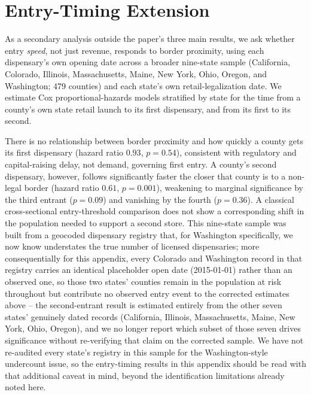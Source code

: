 \documentclass[12pt]{article}
\begin{document}
\appendix

\section{Entry-Timing Extension}
\label{app:entry_timing}

As a secondary analysis outside the paper's three main results, we ask whether entry \emph{speed}, not just
revenue, responds to border proximity, using each dispensary's own opening date across a broader nine-state
sample (California, Colorado, Illinois, Massachusetts, Maine, New York, Ohio, Oregon, and Washington; 479
counties) and each state's own retail-legalization date. We estimate Cox proportional-hazards models
stratified by state for the time from a county's own state retail launch to its first dispensary, and from
its first to its second.



There is no relationship between border proximity and how quickly a county gets its first dispensary
(hazard ratio $0.93$, $p=0.54$), consistent with regulatory and capital-raising delay, not demand, governing
first entry. A county's second dispensary, however, follows significantly faster the closer that county is
to a non-legal border (hazard ratio $0.61$, $p=0.001$), weakening to marginal significance by the third
entrant ($p=0.09$) and vanishing by the fourth ($p=0.36$). A classical cross-sectional entry-threshold
comparison does not show a corresponding shift in the population needed to support a second store. This
nine-state sample was built from a geocoded dispensary registry that, for Washington specifically, we now
know understates the true number of licensed dispensaries; more consequentially for this appendix, every
Colorado and Washington record in that registry carries an identical placeholder open date (2015-01-01) rather
than an observed one, so those two states' counties remain in the population at risk throughout but
contribute no observed entry event to the corrected estimates above -- the second-entrant result is estimated
entirely from the other seven states' genuinely dated records (California, Illinois, Massachusetts, Maine,
New York, Ohio, Oregon), and we no longer report which subset of those seven drives significance without
re-verifying that claim on the corrected sample. We have not re-audited every state's registry in this sample
for the Washington-style undercount issue, so the entry-timing results in this appendix should be read with
that additional caveat in mind, beyond the identification limitations already noted here.
\end{document}

